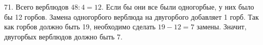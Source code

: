 71. Всего верблюдов $48:4=12.$ Если бы они все были одногорбые, у них было бы 12 горбов. Замена одногорбого верблюда на двугорбого добавляет 1 горб. Так как горбов должно быть 19, необходимо сделать $19-12=7$ замены. Значит, двугорбых верблюдов должно быть 7.\\
